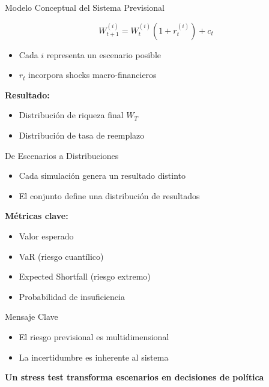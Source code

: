\documentclass{beamer}
\begin{document}
\begin{frame}{Modelo Conceptual del Sistema Previsional}

\[
W_{t+1}^{(i)} = W_t^{(i)} (1 + r_t^{(i)}) + c_t
\]

\begin{itemize}
\item Cada $i$ representa un escenario posible
\item $r_t$ incorpora shocks macro-financieros
\end{itemize}

\vspace{0.4cm}

\textbf{Resultado:}
\begin{itemize}
\item Distribución de riqueza final $W_T$
\item Distribución de tasa de reemplazo
\end{itemize}

\end{frame}
\begin{frame}{De Escenarios a Distribuciones}

\begin{itemize}
\item Cada simulación genera un resultado distinto
\item El conjunto define una distribución de resultados
\end{itemize}

\vspace{0.4cm}

\textbf{Métricas clave:}
\begin{itemize}
\item Valor esperado
\item VaR (riesgo cuantílico)
\item Expected Shortfall (riesgo extremo)
\item Probabilidad de insuficiencia
\end{itemize}

\end{frame}
\begin{frame}{Mensaje Clave}

\begin{itemize}
\item El riesgo previsional es multidimensional
\item La incertidumbre es inherente al sistema
\end{itemize}

\vspace{0.5cm}

\centering
\textbf{Un stress test transforma escenarios en decisiones de política}

\end{frame}
\end{document}
